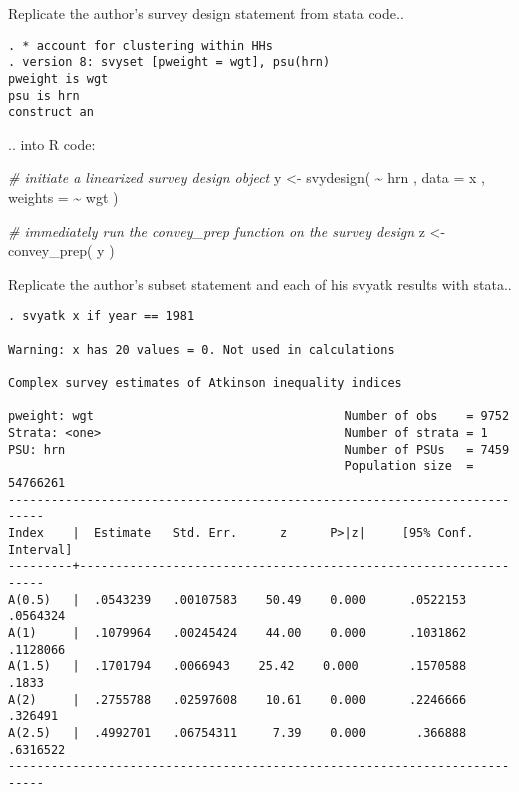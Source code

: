 \documentclass[
]{book}
\newenvironment{Shaded}{\begin{snugshade}}{\end{snugshade}}
\newcommand{\AttributeTok}[1]{\textcolor[rgb]{0.77,0.63,0.00}{#1}}
\newcommand{\CommentTok}[1]{\textcolor[rgb]{0.56,0.35,0.01}{\textit{#1}}}
\newcommand{\FunctionTok}[1]{\textcolor[rgb]{0.00,0.00,0.00}{#1}}
\newcommand{\NormalTok}[1]{#1}
\newcommand{\OtherTok}[1]{\textcolor[rgb]{0.56,0.35,0.01}{#1}}
\newcommand{\SpecialCharTok}[1]{\textcolor[rgb]{0.00,0.00,0.00}{#1}}
\begin{document}
Replicate the author's survey design statement from stata code..

\begin{verbatim}
. * account for clustering within HHs 
. version 8: svyset [pweight = wgt], psu(hrn)
pweight is wgt
psu is hrn
construct an
\end{verbatim}

.. into R code:

\begin{Shaded}
\begin{Highlighting}[]
\CommentTok{\# initiate a linearized survey design object}
\NormalTok{y }\OtherTok{\textless{}{-}} \FunctionTok{svydesign}\NormalTok{( }\SpecialCharTok{\textasciitilde{}}\NormalTok{ hrn , }\AttributeTok{data =}\NormalTok{ x , }\AttributeTok{weights =} \SpecialCharTok{\textasciitilde{}}\NormalTok{ wgt )}

\CommentTok{\# immediately run the \textasciigrave{}convey\_prep\textasciigrave{} function on the survey design}
\NormalTok{z }\OtherTok{\textless{}{-}} \FunctionTok{convey\_prep}\NormalTok{( y )}
\end{Highlighting}
\end{Shaded}

Replicate the author's subset statement and each of his svyatk results with stata..

\begin{verbatim}
. svyatk x if year == 1981
 
Warning: x has 20 values = 0. Not used in calculations

Complex survey estimates of Atkinson inequality indices
 
pweight: wgt                                   Number of obs    = 9752
Strata: <one>                                  Number of strata = 1
PSU: hrn                                       Number of PSUs   = 7459
                                               Population size  = 54766261
---------------------------------------------------------------------------
Index    |  Estimate   Std. Err.      z      P>|z|     [95% Conf. Interval]
---------+-----------------------------------------------------------------
A(0.5)   |  .0543239   .00107583    50.49    0.000      .0522153   .0564324
A(1)     |  .1079964   .00245424    44.00    0.000      .1031862   .1128066
A(1.5)   |  .1701794   .0066943    25.42    0.000       .1570588      .1833
A(2)     |  .2755788   .02597608    10.61    0.000      .2246666    .326491
A(2.5)   |  .4992701   .06754311     7.39    0.000       .366888   .6316522
---------------------------------------------------------------------------
\end{verbatim}
\end{document}
